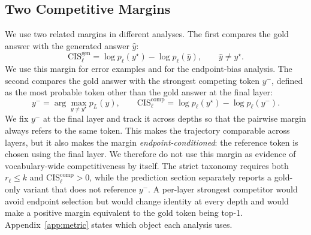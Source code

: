 \documentclass{article} %
\begin{document}
\subsection{Two Competitive Margins}
We use two related margins in different analyses. The first compares the gold answer with the generated answer $\hat{y}$:
\begin{equation}
\mathrm{CIS}^{\mathrm{gen}}_\ell = \log p_\ell(y^\star) - \log p_\ell(\hat{y}), \qquad \hat{y} \neq y^\star .
\end{equation}
We use this margin for error examples and for the endpoint-bias analysis. The second compares the gold answer with the strongest competing token $y^-$, defined as the most probable token other than the gold answer at the final layer:
\begin{equation}
y^- = \arg\max_{y \neq y^\star} p_L(y), \qquad
\mathrm{CIS}^{\mathrm{comp}}_\ell = \log p_\ell(y^\star) - \log p_\ell(y^-) .
\end{equation}
We fix $y^-$ at the final layer and track it across depths so that the pairwise margin always refers to the same token. This makes the trajectory comparable across layers, but it also makes the margin \emph{endpoint-conditioned}: the reference token is chosen using the final layer. We therefore do not use this margin as evidence of vocabulary-wide competitiveness by itself. The strict taxonomy requires both $r_\ell\leq k$ and $\mathrm{CIS}^{\mathrm{comp}}_\ell>0$, while the prediction section separately reports a gold-only variant that does not reference $y^-$. A per-layer strongest competitor would avoid endpoint selection but would change identity at every depth and would make a positive margin equivalent to the gold token being top-1. Appendix~\ref{app:metric} states which object each analysis uses.
\end{document}
